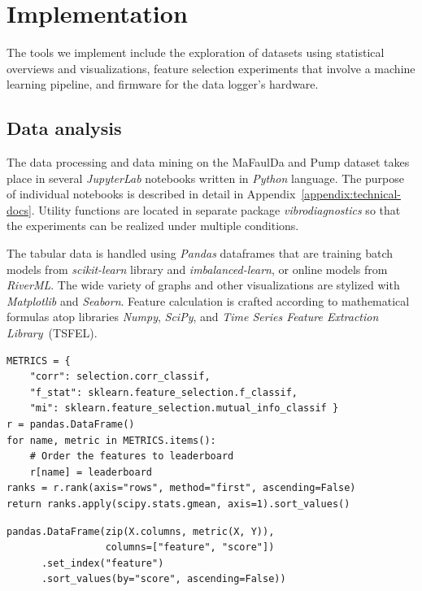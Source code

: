 \chapter{Implementation} \label{chapter:implementation}
The tools we implement include the exploration of datasets using statistical overviews and visualizations, feature selection experiments that involve a machine learning pipeline, and firmware for the data logger's hardware.

\section{Data analysis}
The data processing and data mining on the MaFaulDa and Pump dataset takes place in several \emph{JupyterLab} notebooks written in \emph{Python} language. The purpose of individual notebooks is described in detail in Appendix~\ref{appendix:technical-docs}. Utility functions are located in separate package \emph{vibrodiagnostics} so that the experiments can be realized under multiple conditions.

The tabular data is handled using \emph{Pandas} dataframes that are training batch models from \emph{scikit-learn} library and \emph{imbalanced-learn}, or online models from \emph{RiverML}. The wide variety of graphs and other visualizations are stylized with \emph{Matplotlib} and \emph{Seaborn}. Feature calculation is crafted according to mathematical formulas atop libraries \emph{Numpy}, \emph{SciPy}, and \emph{Time Series Feature Extraction Library}~(TSFEL).

\begin{lstlisting}[style=pythonstyle,caption=Rank product of feature matrix X to label column Y,label={lst:rank-product},morekeywords={DataFrame,rank,set_index,sort_values,gmean}]
METRICS = {
    "corr": selection.corr_classif, 
    "f_stat": sklearn.feature_selection.f_classif, 
    "mi": sklearn.feature_selection.mutual_info_classif }
r = pandas.DataFrame()
for name, metric in METRICS.items():
    # Order the features to leaderboard
    r[name] = leaderboard  
ranks = r.rank(axis="rows", method="first", ascending=False)
return ranks.apply(scipy.stats.gmean, axis=1).sort_values()
\end{lstlisting}

\begin{lstlisting}[style=pythonstyle,caption=Leaderboard of feature importance metric scores,label={lst:feature-leaderboard},morekeywords={DataFrame,rank,set_index,sort_values,metric,gmean}]
pandas.DataFrame(zip(X.columns, metric(X, Y)), 
                 columns=["feature", "score"])
      .set_index("feature")
      .sort_values(by="score", ascending=False))
\end{lstlisting}


